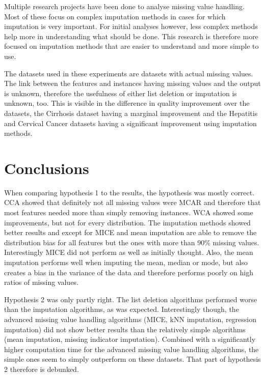 \documentclass[10pt,a4paper]{report}
\begin{document}
	Multiple research projects have been done to analyse missing value handling\cite{donders2006gentle, haukoos2007advanced, patrician2002multiple, sterne2009multiple, pedersen2017missing, raghunathan2001multivariate}. Most of these focus on complex imputation methods in cases for which imputation is very important. For initial analyses however, less complex methods help more in understanding what should be done. This research is therefore more focused on imputation methods that are easier to understand and more simple to use.
	
	The datasets used in these experiments are datasets with actual missing values. The link between the features and instances having missing values and the output is unknown, therefore the usefulness of either list deletion or imputation is unknown, too. This is visible in the difference in quality improvement over the datasets, the Cirrhosis dataset having a marginal improvement and the Hepatitis and Cervical Cancer datasets having a significant improvement using imputation methods.
	
	\section{Conclusions}
	\label{MVsec:Conclusions}
	
	When comparing hypothesis 1 to the results, the hypothesis was mostly correct. CCA showed that definitely not all missing values were MCAR and therefore that most features needed more than simply removing instances. WCA showed some improvements, but not for every distribution. The imputation methods showed better results and except for MICE and mean imputation are able to remove the distribution bias for all features but the ones with more than 90\% missing values. Interestingly MICE did not perform as well as initially thought. Also, the mean imputation performs well when imputing the mean, median or mode, but also creates a bias in the variance of the data and therefore performs poorly on high ratios of missing values.
	
	Hypothesis 2 was only partly right. The list deletion algorithms performed worse than the imputation algorithms, as was expected. Interestingly though, the advanced missing value handling algorithms (MICE, kNN imputation, regression imputation) did not show better results than the relatively simple algorithms (mean imputation, missing indicator imputation). Combined with a significantly higher computation time for the advanced missing value handling algorithms, the simple ones seem to simply outperform on these datasets. That part of hypothesis 2 therefore is debunked.  
	
\end{document}
